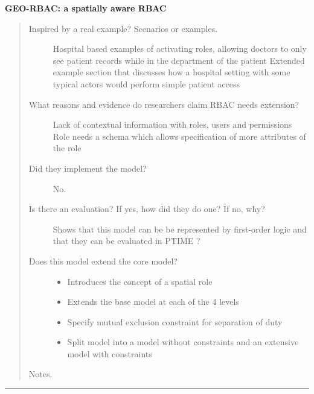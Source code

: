 \documentclass[letterpaper,10pt,english]{sphinxmanual}
\begin{document}
\textbf{GEO-RBAC: a spatially aware RBAC}
\begin{quote}
\begin{description}
\item[{Inspired by a real example? Scenarios or examples.}] \leavevmode
Hospital based examples of activating roles, allowing doctors to only see patient records while in the department of the patient
Extended example section that discusses how a hospital setting with some typical actors would perform simple patient access

\item[{What reasons and evidence do researchers claim RBAC needs extension?}] \leavevmode
Lack of contextual information with roles, users and permissions
Role needs a schema which allows specification of more attributes of the role

\item[{Did they implement the model?}] \leavevmode
No.

\item[{Is there an evaluation? If yes, how did they do one? If no, why?}] \leavevmode
Shows that this model can be be represented by first-order logic and that they can be evaluated in PTIME ?

\item[{Does this model extend the core model?}] \leavevmode\begin{itemize}
\item {} 
Introduces the concept of a spatial role

\item {} 
Extends the base model at each of the 4 levels

\item {} 
Specify mutual exclusion constraint for separation of duty

\item {} 
Split model into a model without constraints and an extensive model with constraints

\end{itemize}

\end{description}

Notes.
\end{quote}


\bigskip\hrule{}\bigskip
\end{document}
